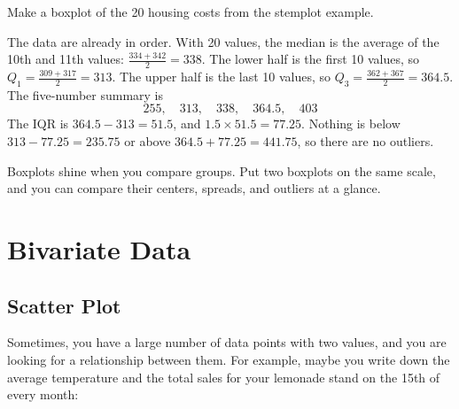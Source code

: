 \begin{Worked}
\begin{Problem}
Make a boxplot of the 20 housing costs from the stemplot example.
\end{Problem}
\begin{Solution}
The data are already in order. With 20 values, the median is the average of the 10th and 11th values: $\frac{334 + 342}{2} = 338$. The lower half is the first 10 values, so $Q_1 = \frac{309 + 317}{2} = 313$. The upper half is the last 10 values, so $Q_3 = \frac{362 + 367}{2} = 364.5$. The five-number summary is
$$255, \quad 313, \quad 338, \quad 364.5, \quad 403$$
The IQR is $364.5 - 313 = 51.5$, and $1.5 \times 51.5 = 77.25$. Nothing is below $313 - 77.25 = 235.75$ or above $364.5 + 77.25 = 441.75$, so there are no outliers.

\begin{center}
\end{center}
\end{Solution}
\end{Worked}

Boxplots shine when you compare groups. Put two boxplots on the same scale, and you can compare their centers, spreads, and outliers at a glance.

\section{Bivariate Data}


\subsection{Scatter Plot}

Sometimes, you have a large number of data points with two values, and you are
looking for a relationship between them.  For example, maybe you write
down the average temperature and the total sales for your lemonade
stand on the 15th of every month:

